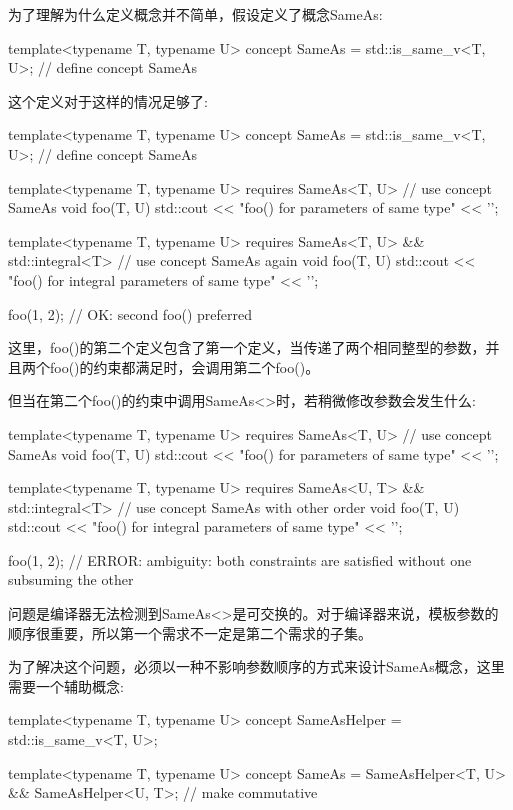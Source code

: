 为了理解为什么定义概念并不简单，假设定义了概念SameAs:

\begin{cpp}
template<typename T, typename U>
concept SameAs = std::is_same_v<T, U>; // define concept SameAs
\end{cpp}

这个定义对于这样的情况足够了:

\begin{cpp}
template<typename T, typename U>
concept SameAs = std::is_same_v<T, U>; // define concept SameAs

template<typename T, typename U>
requires SameAs<T, U> // use concept SameAs
void foo(T, U)
{
	std::cout << "foo() for parameters of same type" << '\n';
}

template<typename T, typename U>
requires SameAs<T, U> && std::integral<T> // use concept SameAs again
void foo(T, U)
{
	std::cout << "foo() for integral parameters of same type" << '\n';
}

foo(1, 2); // OK: second foo() preferred
\end{cpp}

这里，foo()的第二个定义包含了第一个定义，当传递了两个相同整型的参数，并且两个foo()的约束都满足时，会调用第二个foo()。

但当在第二个foo()的约束中调用SameAs<>时，若稍微修改参数会发生什么:

\begin{cpp}
template<typename T, typename U>
requires SameAs<T, U> // use concept SameAs
void foo(T, U)
{
	std::cout << "foo() for parameters of same type" << '\n';
}

template<typename T, typename U>
requires SameAs<U, T> && std::integral<T> // use concept SameAs with other order
void foo(T, U)
{
	std::cout << "foo() for integral parameters of same type" << '\n';
}

foo(1, 2); // ERROR: ambiguity: both constraints are satisfied without one subsuming the other
\end{cpp}

问题是编译器无法检测到SameAs<>是可交换的。对于编译器来说，模板参数的顺序很重要，所以第一个需求不一定是第二个需求的子集。

为了解决这个问题，必须以一种不影响参数顺序的方式来设计SameAs概念，这里需要一个辅助概念:

\begin{cpp}
template<typename T, typename U>
concept SameAsHelper = std::is_same_v<T, U>;

template<typename T, typename U>
concept SameAs = SameAsHelper<T, U> && SameAsHelper<U, T>; // make commutative
\end{cpp}

